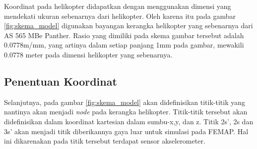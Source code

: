 Koordinat pada helikopter didapatkan dengan menggunakan dimensi yang mendekati ukuran sebenarnya dari helikopter. Oleh karena itu pada gambar \ref{fig:skema_model} digunakan bayangan kerangka helikopter yang sebenarnya dari AS 565 MBe Panther. Rasio yang dimiliki pada skema gambar tersebut adalah 0.0778m/mm, yang artinya dalam setiap panjang 1mm pada gambar, mewakili 0.0778 meter pada dimensi helikopter yang sebenarnya.

\subsection{Penentuan Koordinat}

Selanjutnya, pada gambar \ref{fig:skema_model} akan didefinisikan titik-titik yang nantinya akan menjadi \textit{node} pada kerangka helikopter. Titik-titik tersebut akan didefinisikan dalam koordinat kartesian dalam sumbu-x,y, dan z. Titik 2s', 2s dan 3s' akan menjadi titik diberikannya gaya luar untuk simulasi pada FEMAP. Hal ini dikarenakan pada titik tersebut terdapat sensor akselerometer.


